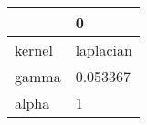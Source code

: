 \begin{tabular}{ll}
\toprule
{} &          0 \\
\midrule
kernel &  laplacian \\
gamma  &   0.053367 \\
alpha  &          1 \\
\bottomrule
\end{tabular}
